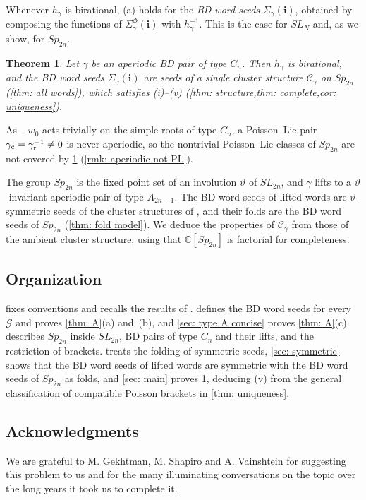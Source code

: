 \documentclass[a4paper]{amsart}
\numberwithin{equation}{section}
\newtheorem{theorem}{Theorem}[section]
\theoremstyle{definition}
\theoremstyle{remark}
\newcommand{\bbC}{\mathbb{C}}
\newcommand{\mcG}{\mathcal{G}}
\newcommand{\mcC}{\mathcal{C}}
\newcommand{\bfi}{\mathbf{i}}
\newcommand{\vt}{\vartheta}
\newcommand{\rr}{{\rm r}}
\newcommand{\cc}{{\rm c}}
\newcommand{\Sp}{Sp_{2n}}
\newcommand{\SL}{SL_{2n}}
\begin{document}
Whenever $h_\gamma$ is birational, (a) holds for the \emph{BD word seeds} $\Sigma_\gamma(\bfi)$, obtained by composing the functions of $\Sigma^\Phi_\gamma(\bfi)$ with $h_\gamma^{-1}$. This is the case for $SL_N$ \cite{GSV23} and, as we show, for $Sp_{2n}$.

\begin{theorem}
  \label{thm: main}
  Let $\gamma$ be an aperiodic BD pair of type $C_n$.
  Then $h_\gamma$ is birational, and the BD word seeds $\Sigma_\gamma(\bfi)$ are seeds of a single cluster structure $\mcC_\gamma$ on $\Sp$ (\cref{thm: all words}), which satisfies (i)--(v) (\cref{thm: structure,thm: complete,cor: uniqueness}).
\end{theorem}

As $-w_0$ acts trivially on the simple roots of type $C_n$, a Poisson--Lie pair $\gamma_{\cc}=\gamma_{\rr}^{-1}\neq0$ is never aperiodic, so the nontrivial Poisson--Lie classes of $Sp_{2n}$ are not covered by \cref{thm: main} (\cref{rmk: aperiodic not PL}).

The group $\Sp$ is the fixed point set of an involution $\vt$ of $\SL$, and $\gamma$ lifts to a $\vt$-invariant aperiodic pair of type $A_{2n-1}$.
The BD word seeds of lifted words are $\vt$-symmetric seeds of the cluster structures of \cite{GSV23}, and their folds are the BD word seeds of $\Sp$ (\cref{thm: fold model}).
We deduce the properties of $\mcC_\gamma$ from those of the ambient cluster structure, using that $\bbC[\Sp]$ is factorial for completeness.

\subsection*{Organization}
 fixes conventions and recalls the results of \cite{GSV19,GSV23}.
 defines the BD word seeds for every $\mcG$ and proves \cref{thm: A}(a) and~(b), and \cref{sec: type A concise} proves \cref{thm: A}(c).
 describes $\Sp$ inside $\SL$, BD pairs of type $C_n$ and their lifts, and the restriction of brackets.
 treats the folding of symmetric seeds, \cref{sec: symmetric} shows that the BD word seeds of lifted words are symmetric with the BD word seeds of $\Sp$ as folds, and \cref{sec: main} proves \cref{thm: main}, deducing (v) from the general classification of compatible Poisson brackets in \cref{thm: uniqueness}.

\subsection*{Acknowledgments}
We are grateful to M. Gekhtman, M. Shapiro and A. Vainshtein for suggesting this problem to us and for the many illuminating conversations on the topic over the long years it took us to complete it.
\end{document}
